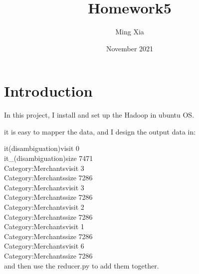 \documentclass{article}
\title{Homework5}
\author{Ming Xia}
\date{November 2021}
\begin{document}
\maketitle

\section{Introduction}

In this project, I install and set up the Hadoop in ubuntu OS. 

it is easy to mapper the data, and I design the output data in:

        it(disambiguation){visit}    0     \\
        it_(disambiguation){size}    7471\\
        Category:Merchants{visit}    3\\
        Category:Merchants{size}    7286\\
        Category:Merchants{visit}    3\\
        Category:Merchants{size}    7286\\
        Category:Merchants{visit}    2\\
        Category:Merchants{size}    7286\\
        Category:Merchants{visit}    1\\
        Category:Merchants{size}    7286\\
        Category:Merchants{visit}    6\\
        Category:Merchants{size}    7286\\
    
and then use the reducer.py to add them together. 
\end{document}
